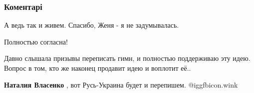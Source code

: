  
 
 
 
 
\subsubsection{Коментарі}

\begin{itemize}
 
А ведь так и живем. Спасибо, Женя - я не задумывалась.

 
Полностью согласна!

 
Давно слышала призывы переписать гимн, и полностью поддерживаю эту идею. Вопрос в том, кто же наконец продавит идею и воплотит её..

\begin{itemize}
 
\textbf{Наталия Власенко} , вот Русь-Украина будет и перепишем. @igg{fbicon.wink}

 

\end{itemize}
\end{itemize}
